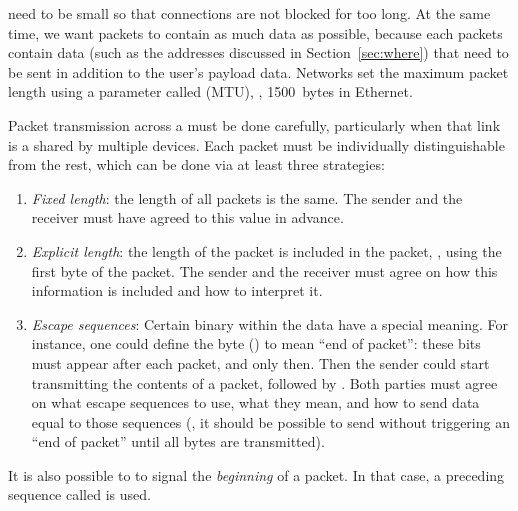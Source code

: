  need to be small so that connections are not blocked for too long. 
At the same time, we want packets to contain as much data as possible, because each packets 
contain  data (such as the addresses discussed in Section~\ref{sec:where}) that need
to be sent in addition to the user's payload data. Networks set the maximum packet length
using a parameter called  (MTU), \eg, 1500~bytes in Ethernet.


Packet transmission across a  must be done carefully,
particularly when that link is a  shared by multiple devices.
Each packet must be individually distinguishable from the rest, 
which can be done via at least three strategies:
\begin{enumerate}
\item \textit{Fixed length}: the length of all packets is the same. The sender and the receiver must have
agreed to this value in advance.

\item \textit{Explicit length}: the length of the packet is included in the packet, \eg, 
using the first byte of the packet. The sender and the receiver must agree on how this information
is included and how to interpret it.

\item \textit{Escape sequences}: Certain binary  
within the data have a special meaning. 
For instance, one could define the byte  () 
to mean ``end of packet'': these bits must appear after each packet, and only then.
% 
Then the sender could start transmitting the contents of a packet, followed by .
Both parties must agree on what escape sequences to use, what they mean, and how to 
send data equal to those sequences (\eg, it should be possible to send 
without triggering an ``end of packet'' until all bytes are transmitted).
\end{enumerate}

\begin{remark}
It is also possible to to signal the \textit{beginning} of a packet. In that case, a preceding sequence called  is used.
\end{remark}



